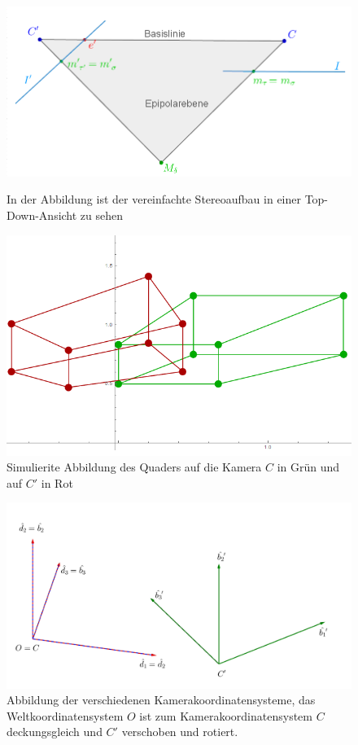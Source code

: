 \begin{figure}[!htb]
	\includegraphics[width=\linewidth]{images/SynthetischesBeispielAufbauTopDown_beschriftet.png}
	\caption[Synthetisches Beispiel Top-Down-Ansicht]{In der Abbildung ist der vereinfachte Stereoaufbau in einer Top-Down-Ansicht zu sehen}
	\label{fig:aufbauMinimalTopDown}
	\endminipage\hfill
	\includegraphics[width=\linewidth]{images/QuadrateMinimalBeispiel.png}
	\caption[Simulierte Abbildung eines Quaders auf zwei Kameras]{Simulierite Abbildung des Quaders auf die Kamera $C$ in Grün und auf $C'$ in Rot}
	\label{fig:AbbildungenMinimal}
	\endminipage\hfill
\end{figure}

\begin{figure}[!htb]
	\centering
	\includegraphics[width=.6\linewidth]{images/KS_Minimalbeispiel_beschriftet.png}
	\caption[Koordinatensysteme von $C$ und $C'$]{Abbildung der verschiedenen Kamerakoordinatensysteme, das Weltkoordinatensystem  $O$ ist zum Kamerakoordinatensystem $C$ deckungsgleich und $C'$  verschoben und rotiert.}
	\label{fig:KoordsystemeMinimal}
\end{figure}

